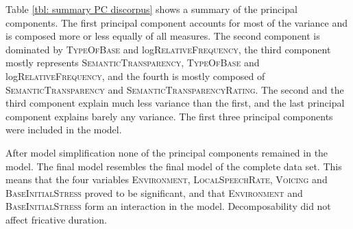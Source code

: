 Table \ref{tbl: summary PC discorpus} shows a summary of the principal components. The first principal component accounts for most of the variance and is composed more or less equally of all measures. The second component is dominated by \textsc{TypeOfBase} and log\textsc{RelativeFrequency}, the third component mostly represents \textsc{SemanticTransparency}, \textsc{TypeOfBase} and log\textsc{RelativeFrequency}, and the fourth is mostly composed of \textsc{SemanticTransparency} and \textsc{SemanticTransparencyRating}. The second and the third component explain much less variance than the first, and the last principal component explains barely any variance. The first three principal components were included in the model.


\clearpage
After model simplification none of the principal components remained in the model. The final model resembles the final model of the complete data set. This means that the four variables \textsc{Environment}, \textsc{LocalSpeechRate}, \textsc{Voicing} and \textsc{BaseInitialStress} proved to be significant, and that \textsc{Environment} and \textsc{BaseInitialStress} form an interaction in the model. Decomposability did not affect fricative duration. 


\begin{table}[t!]
	\caption{ Summary of principal components}
	\label{tbl: summary PC discorpus}
	
	
\end{table}


